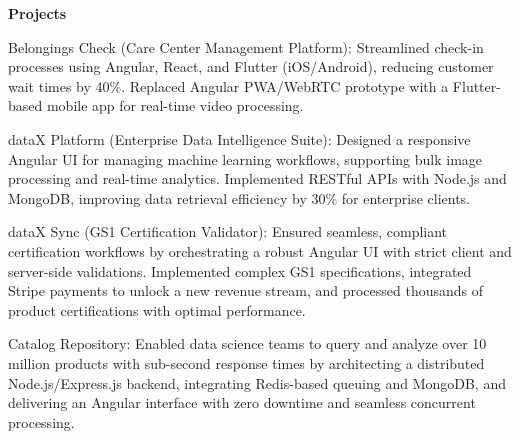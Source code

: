 
\normalsize\textbf{Projects}\vspace{4pt}
\begin{sectionContainer}
	{Belongings Check (Care Center Management Platform):} {Streamlined check-in processes using Angular, React, and Flutter (iOS/Android), reducing customer wait times by 40\%. Replaced Angular PWA/WebRTC prototype with a Flutter-based mobile app for real-time video processing.}
\end{sectionContainer}

\begin{sectionContainer}
	{dataX Platform (Enterprise Data Intelligence Suite):} {Designed a responsive Angular UI for managing machine learning workflows, supporting bulk image processing and real-time analytics. Implemented RESTful APIs with Node.js and MongoDB, improving data retrieval efficiency by 30\% for enterprise clients.}
\end{sectionContainer}

\begin{sectionContainer}
	{dataX Sync (GS1 Certification Validator):} {Ensured seamless, compliant certification workflows by orchestrating a robust Angular UI with strict client and server-side validations. Implemented complex GS1 specifications, integrated Stripe payments to unlock a new revenue stream, and processed thousands of product certifications with optimal performance.}
\end{sectionContainer}

\begin{sectionContainer}
	{Catalog Repository:} {Enabled data science teams to query and analyze over 10 million products with sub-second response times by architecting a distributed Node.js/Express.js backend, integrating Redis-based queuing and MongoDB, and delivering an Angular interface with zero downtime and seamless concurrent processing.}
\end{sectionContainer}

